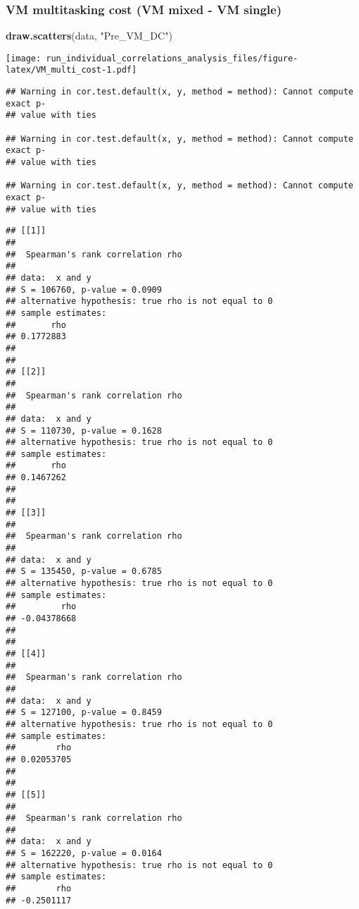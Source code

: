\documentclass[]{article}
\newenvironment{Shaded}{\begin{snugshade}}{\end{snugshade}}
\newcommand{\KeywordTok}[1]{\textcolor[rgb]{0.13,0.29,0.53}{\textbf{#1}}}
\newcommand{\DataTypeTok}[1]{\textcolor[rgb]{0.13,0.29,0.53}{#1}}
\newcommand{\StringTok}[1]{\textcolor[rgb]{0.31,0.60,0.02}{#1}}
\newcommand{\OperatorTok}[1]{\textcolor[rgb]{0.81,0.36,0.00}{\textbf{#1}}}
\newcommand{\NormalTok}[1]{#1}
\begin{document}
\subsubsection{VM multitasking cost (VM mixed - VM
single)}\label{vm-multitasking-cost-vm-mixed---vm-single}

\begin{Shaded}
\begin{Highlighting}[]
\KeywordTok{draw.scatters}\NormalTok{(data, }\StringTok{"Pre_VM_DC"}\NormalTok{)}
\end{Highlighting}
\end{Shaded}

\texttt{[image: run\_individual\_correlations\_analysis\_files/figure-latex/VM\_multi\_cost-1.pdf]}

\begin{Shaded}
\end{Shaded}

\begin{verbatim}
## Warning in cor.test.default(x, y, method = method): Cannot compute exact p-
## value with ties

## Warning in cor.test.default(x, y, method = method): Cannot compute exact p-
## value with ties

## Warning in cor.test.default(x, y, method = method): Cannot compute exact p-
## value with ties
\end{verbatim}

\begin{verbatim}
## [[1]]
## 
##  Spearman's rank correlation rho
## 
## data:  x and y
## S = 106760, p-value = 0.0909
## alternative hypothesis: true rho is not equal to 0
## sample estimates:
##       rho 
## 0.1772883 
## 
## 
## [[2]]
## 
##  Spearman's rank correlation rho
## 
## data:  x and y
## S = 110730, p-value = 0.1628
## alternative hypothesis: true rho is not equal to 0
## sample estimates:
##       rho 
## 0.1467262 
## 
## 
## [[3]]
## 
##  Spearman's rank correlation rho
## 
## data:  x and y
## S = 135450, p-value = 0.6785
## alternative hypothesis: true rho is not equal to 0
## sample estimates:
##         rho 
## -0.04378668 
## 
## 
## [[4]]
## 
##  Spearman's rank correlation rho
## 
## data:  x and y
## S = 127100, p-value = 0.8459
## alternative hypothesis: true rho is not equal to 0
## sample estimates:
##        rho 
## 0.02053705 
## 
## 
## [[5]]
## 
##  Spearman's rank correlation rho
## 
## data:  x and y
## S = 162220, p-value = 0.0164
## alternative hypothesis: true rho is not equal to 0
## sample estimates:
##        rho 
## -0.2501117
\end{verbatim}
\end{document}
